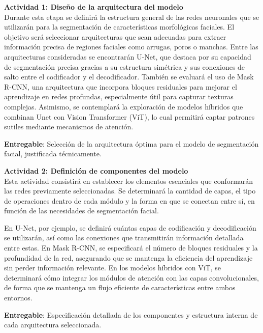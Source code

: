  \textbf{Actividad 1: Diseño de la arquitectura del modelo}
 \\
 Durante esta etapa se definirá la estructura general de las redes neuronales que se utilizarán para la segmentación de características morfológicas faciales. El objetivo será seleccionar arquitecturas que sean adecuadas para extraer información precisa de regiones faciales como arrugas, poros o manchas.
 Entre las arquitecturas consideradas se encontrarán U-Net, que destaca por su capacidad de segmentación precisa gracias a su estructura simétrica y sus conexiones de salto entre el codificador y el decodificador. También se evaluará el uso de Mask R-CNN, una arquitectura que incorpora bloques residuales para mejorar el aprendizaje en redes profundas, especialmente útil para capturar texturas complejas. Asimismo, se contemplará la exploración de modelos híbridos que combinan Unet con Vision Transformer (ViT), lo cual permitirá captar patrones sutiles mediante mecanismos de atención.
 
 \textbf{Entregable}: Selección de la arquitectura óptima para el modelo de segmentación facial, justificada técnicamente.

 \textbf{Actividad 2: Definición de componentes del modelo}
 \\
Esta actividad consistirá en establecer los elementos esenciales que conformarán las redes previamente seleccionadas. Se determinará la cantidad de capas, el tipo de operaciones dentro de cada módulo y la forma en que se conectan entre sí, en función de las necesidades de segmentación facial.

En U-Net, por ejemplo, se definirá cuántas capas de codificación y decodificación se utilizarán, así como las conexiones que transmitirán información detallada entre estas. En Mask R-CNN, se especificará el número de bloques residuales y la profundidad de la red, asegurando que se mantenga la eficiencia del aprendizaje sin perder información relevante. En los modelos híbridos con ViT, se determinará cómo integrar los módulos de atención con las capas convolucionales, de forma que se mantenga un flujo eficiente de características entre ambos entornos.

 \textbf{Entregable}: Especificación detallada de los componentes y estructura interna de cada arquitectura seleccionada.

